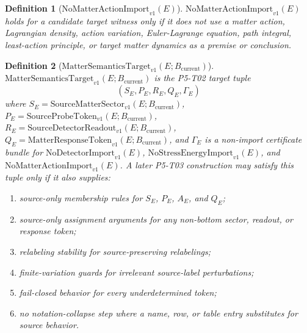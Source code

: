 \documentclass[11pt]{article}
\newcommand{\Bcur}{B_{\mathrm{current}}}
\newcommand{\MatterSector}{\mathrm{SourceMatterSector}_{v1}}
\newcommand{\ProbeToken}{\mathrm{SourceProbeToken}_{v1}}
\newcommand{\DetectorReadout}{\mathrm{SourceDetectorReadout}_{v1}}
\newcommand{\ResponseToken}{\mathrm{MatterResponseToken}_{v1}}
\newcommand{\NoSE}{\mathrm{NoStressEnergyImport}_{v1}}
\newcommand{\NoAction}{\mathrm{NoMatterActionImport}_{v1}}
\newcommand{\NoDetector}{\mathrm{NoDetectorImport}_{v1}}
\newcommand{\Target}{\mathrm{MatterSemanticsTarget}_{v1}}
\newtheorem{definition}{Definition}
\begin{document}
\begin{definition}[\(\NoAction(E)\)]
\(\NoAction(E)\) holds for a candidate target witness only if it does not use
a matter action, Lagrangian density, action variation, Euler-Lagrange
equation, path integral, least-action principle, or target matter dynamics as
a premise or conclusion.
\end{definition}

\begin{definition}[\(\Target(E;\Bcur)\)]
\(\Target(E;\Bcur)\) is the P5-T02 target tuple
\[
  (S_E,P_E,R_E,Q_E,\Gamma_E)
\]
where \(S_E=\MatterSector(E;\Bcur)\), \(P_E=\ProbeToken(E;\Bcur)\),
\(R_E=\DetectorReadout(E;\Bcur)\), \(Q_E=\ResponseToken(E;\Bcur)\), and
\(\Gamma_E\) is a non-import certificate bundle for \(\NoDetector(E)\),
\(\NoSE(E)\), and \(\NoAction(E)\). A later P5-T03 construction may satisfy
this tuple only if it also supplies:
\begin{enumerate}[leftmargin=*]
\item source-only membership rules for \(S_E\), \(P_E\), \(A_E\), and \(Q_E\);
\item source-only assignment arguments for any non-bottom sector, readout, or
  response token;
\item relabeling stability for source-preserving relabelings;
\item finite-variation guards for irrelevant source-label perturbations;
\item fail-closed behavior for every underdetermined token;
\item no notation-collapse step where a name, row, or table entry substitutes
  for source behavior.
\end{enumerate}
\end{definition}
\end{document}
